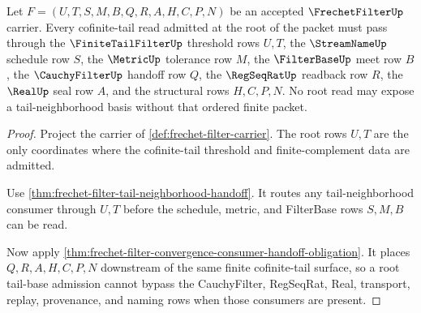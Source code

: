 \begin{theorem}
\label{thm:frechet-filter-root-tail-base-admission}
Let $F=(U,T,S,M,B,Q,R,A,H,C,P,N)$ be an accepted $\FrechetFilterUp$ carrier. Every cofinite-tail read admitted at the root of the packet must pass through the $\FiniteTailFilterUp$ threshold rows $U,T$, the $\StreamNameUp$ schedule row $S$, the $\MetricUp$ tolerance row $M$, the $\FilterBaseUp$ meet row $B$, the $\CauchyFilterUp$ handoff row $Q$, the $\RegSeqRatUp$ readback row $R$, the $\RealUp$ seal row $A$, and the structural rows $H,C,P,N$. No root read may expose a tail-neighborhood basis without that ordered finite packet.
\end{theorem}
\begin{proof}
Project the carrier of \autoref{def:frechet-filter-carrier}. The root rows $U,T$ are the only coordinates where the cofinite-tail threshold and finite-complement data are admitted.

Use \autoref{thm:frechet-filter-tail-neighborhood-handoff}. It routes any tail-neighborhood consumer through $U,T$ before the schedule, metric, and FilterBase rows $S,M,B$ can be read.

Now apply \autoref{thm:frechet-filter-convergence-consumer-handoff-obligation}. It places $Q,R,A,H,C,P,N$ downstream of the same finite cofinite-tail surface, so a root tail-base admission cannot bypass the CauchyFilter, RegSeqRat, Real, transport, replay, provenance, and naming rows when those consumers are present.
\end{proof}


